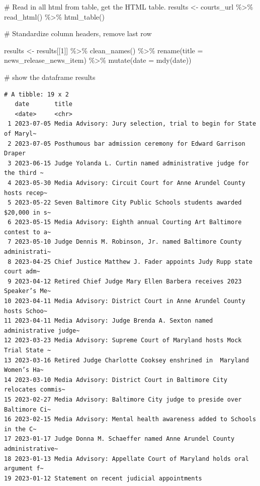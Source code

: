 \documentclass[
  letterpaper,
  DIV=11,
  numbers=noendperiod]{scrreprt}
\newenvironment{Shaded}{\begin{snugshade}}{\end{snugshade}}
\newcommand{\AttributeTok}[1]{\textcolor[rgb]{0.40,0.45,0.13}{#1}}
\newcommand{\CommentTok}[1]{\textcolor[rgb]{0.37,0.37,0.37}{#1}}
\newcommand{\DecValTok}[1]{\textcolor[rgb]{0.68,0.00,0.00}{#1}}
\newcommand{\FunctionTok}[1]{\textcolor[rgb]{0.28,0.35,0.67}{#1}}
\newcommand{\NormalTok}[1]{\textcolor[rgb]{0.00,0.23,0.31}{#1}}
\newcommand{\OtherTok}[1]{\textcolor[rgb]{0.00,0.23,0.31}{#1}}
\newcommand{\SpecialCharTok}[1]{\textcolor[rgb]{0.37,0.37,0.37}{#1}}
\begin{document}
\begin{Shaded}
\begin{Highlighting}[]
\CommentTok{\# Read in all html from table, get the HTML table.}
\NormalTok{results }\OtherTok{\textless{}{-}}\NormalTok{ courts\_url }\SpecialCharTok{\%\textgreater{}\%}
  \FunctionTok{read\_html}\NormalTok{() }\SpecialCharTok{\%\textgreater{}\%}
  \FunctionTok{html\_table}\NormalTok{()}

\CommentTok{\# Standardize column headers, remove last row}

\NormalTok{results }\OtherTok{\textless{}{-}}\NormalTok{ results[[}\DecValTok{1}\NormalTok{]] }\SpecialCharTok{\%\textgreater{}\%}
  \FunctionTok{clean\_names}\NormalTok{() }\SpecialCharTok{\%\textgreater{}\%}
  \FunctionTok{rename}\NormalTok{(}\AttributeTok{title =}\NormalTok{ news\_release\_news\_item) }\SpecialCharTok{\%\textgreater{}\%}
  \FunctionTok{mutate}\NormalTok{(}\AttributeTok{date =} \FunctionTok{mdy}\NormalTok{(date))}

\CommentTok{\# show the dataframe}
\NormalTok{results}
\end{Highlighting}
\end{Shaded}

\begin{verbatim}
# A tibble: 19 x 2
   date       title                                                             
   <date>     <chr>                                                             
 1 2023-07-05 Media Advisory: Jury selection, trial to begin for State of Maryl~
 2 2023-07-05 Posthumous bar admission ceremony for Edward Garrison Draper      
 3 2023-06-15 Judge Yolanda L. Curtin named administrative judge for the third ~
 4 2023-05-30 Media Advisory: Circuit Court for Anne Arundel County hosts recep~
 5 2023-05-22 Seven Baltimore City Public Schools students awarded $20,000 in s~
 6 2023-05-15 Media Advisory: Eighth annual Courting Art Baltimore contest to a~
 7 2023-05-10 Judge Dennis M. Robinson, Jr. named Baltimore County administrati~
 8 2023-04-25 Chief Justice Matthew J. Fader appoints Judy Rupp state court adm~
 9 2023-04-12 Retired Chief Judge Mary Ellen Barbera receives 2023 Speaker’s Me~
10 2023-04-11 Media Advisory: District Court in Anne Arundel County hosts Schoo~
11 2023-04-11 Media Advisory: Judge Brenda A. Sexton named administrative judge~
12 2023-03-23 Media Advisory: Supreme Court of Maryland hosts Mock Trial State ~
13 2023-03-16 Retired Judge Charlotte Cooksey enshrined in  Maryland Women’s Ha~
14 2023-03-10 Media Advisory: District Court in Baltimore City relocates commis~
15 2023-02-27 Media Advisory: Baltimore City judge to preside over Baltimore Ci~
16 2023-02-15 Media Advisory: Mental health awareness added to Schools in the C~
17 2023-01-17 Judge Donna M. Schaeffer named Anne Arundel County administrative~
18 2023-01-13 Media Advisory: Appellate Court of Maryland holds oral argument f~
19 2023-01-12 Statement on recent judicial appointments                         
\end{verbatim}
\end{document}
